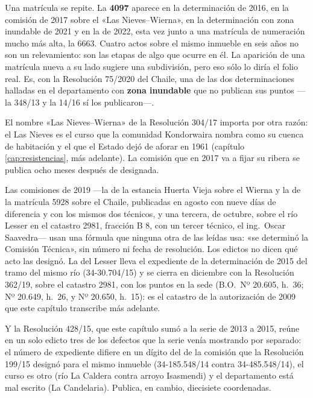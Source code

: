 \begin{cautela}
Una matrícula se repite. La \textbf{4097} aparece en la determinación de 2016, en la comisión de 2017 sobre el «Las Nieves--Wierna», en la determinación con zona inundable de 2021 y en la de 2022, esta vez junto a una matrícula de numeración mucho más alta, la 6663. Cuatro actos sobre el mismo inmueble en seis años no son un relevamiento: son las etapas de algo que ocurre en él. La aparición de una matrícula nueva a su lado sugiere una subdivisión, pero eso sólo lo diría el folio real. Es, con la Resolución 75/2020 del Chaile, una de las dos determinaciones halladas en el departamento con \textbf{zona inundable} que no publican sus puntos ---la 348/13 y la 14/16 sí los publicaron---.

El nombre «Las Nieves--Wierna» de la Resolución 304/17 importa por otra razón: el Las Nieves es el curso que la comunidad Kondorwaira nombra como su cuenca de habitación y el que el Estado dejó de aforar en 1961 (capítulo \ref{cap:resistencias}, más adelante). La comisión que en 2017 va a fijar su ribera se publica ocho meses después de designada.

Las comisiones de 2019 ---la de la estancia Huerta Vieja sobre el Wierna y la de la matrícula 5928 sobre el Chaile, publicadas en agosto con nueve días de diferencia y con los mismos dos técnicos, y una tercera, de octubre, sobre el río Lesser en el catastro 2981, fracción B 8, con un tercer técnico, el ing.\ Oscar Saavedra--- usan una fórmula que ninguna otra de las leídas usa: «se determinó la Comisión Técnica», sin número ni fecha de resolución. Los edictos no dicen qué acto las designó. La del Lesser lleva el expediente de la determinación de 2015 del tramo del mismo río (34-30.704/15) y se cierra en diciembre con la Resolución 362/19, sobre el catastro 2981, con los puntos en la sede (B.O.\ Nº 20.605, h.\ 36; Nº 20.649, h.\ 26, y Nº 20.650, h.\ 15): es el catastro de la autorización de 2009 que este capítulo transcribe más adelante.

Y la Resolución 428/15, que este capítulo sumó a la serie de 2013 a 2015, reúne en un solo edicto tres de los defectos que la serie venía mostrando por separado: el número de expediente difiere en un dígito del de la comisión que la Resolución 199/15 designó para el mismo inmueble (34-185.548/14 contra 34-485.548/14), el curso es otro (río La Caldera contra arroyo Isasmendi) y el departamento está mal escrito (La Candelaria). Publica, en cambio, diecisiete coordenadas. 
\end{cautela}

